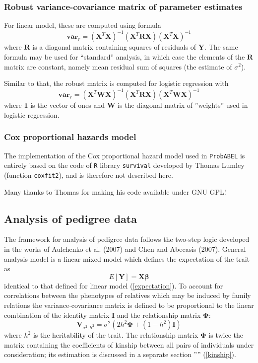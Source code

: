 \documentclass[12pt]{article}
\begin{document}
\subsubsection{Robust variance-covariance matrix of parameter estimates}

For linear model, these are computed using formula
$$
\mathbf{var}_r = (\mathbf{X}^T\mathbf{X})^{-1} (\mathbf{X}^T\mathbf{R}\mathbf{X})
(\mathbf{X}^T\mathbf{X})^{-1}
$$
where $\mathbf{R}$ is a diagonal matrix containing squares of residuals
of $\mathbf{Y}$. The 
same formula may be used for ``standard'' analysis, in which case
the elements of the $\mathbf{R}$ matrix are constant, namely mean 
residual sum of squares (the estimate of $\sigma^2$).

Similar to that, the robust matrix is computed for logistic regression with
$$
\mathbf{var}_r = (\mathbf{X}^T \mathbf{W} \mathbf{X})^{-1} (\mathbf{X}^T\mathbf{R}\mathbf{X})
(\mathbf{X}^T \mathbf{W} \mathbf{X})^{-1}
$$
where $\mathbf{1}$ is the vector of ones and $\mathbf{W}$ is the diagonal matrix 
of ''weights'' used in logistic regression. 


\subsubsection{Cox proportional hazards model}

The implementation of the Cox proportional hazard model used 
in \texttt{ProbABEL} is entirely based on the code of \texttt{R} 
library \texttt{survival} developed by Thomas Lumley 
(function \texttt{coxfit2}), and is therefore not described here. 

Many thanks to Thomas for making his code available under GNU GPL!

\subsection{Analysis of pedigree data}

The framework for analysis of pedigree data follows the two-step 
logic developed in the works of Aulchenko et al. (2007) and Chen and Abecasis
(2007). General analysis model is a linear mixed model which defines the
expectation of the trait as 
$$
E[\mathbf{Y}] = \mathbf{X} \mathbf{\beta}
$$
identical to that defined for linear model (\ref{expectation}).
To account for correlations between the phenotypes of
relatives which may be induced by family relations the variance-covariance 
matrix is defined to be proportional to the linear combination of the
identity matrix $\mathbf{I}$ and the relationship matrix $\mathbf{\Phi}$: 
$$
\mathbf{V}_{\sigma^2,h^2} = \sigma^2 (2 h^2 \mathbf{\Phi} + (1-h^2) \mathbf{I})
$$
where $h^2$ is the heritability of the trait. 
The relationship matrix $\mathbf{\Phi}$ is twice the matrix containing 
the coefficients of kinship between all pairs of individuals under consideration; 
its estimation is discussed in a separate section '''' (\ref{kinship}).
\end{document}
